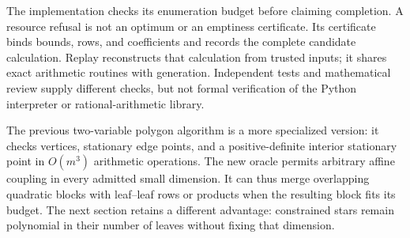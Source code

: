 The implementation
checks its enumeration budget before claiming completion. A resource
refusal is not an optimum or an emptiness certificate. Its certificate
binds bounds, rows, and coefficients and records the complete candidate
calculation. Replay reconstructs that calculation from trusted inputs;
it shares exact arithmetic routines with generation. Independent tests
and mathematical review supply different checks, but not formal
verification of the Python interpreter or rational-arithmetic library.

The previous two-variable polygon algorithm is a more specialized version:
it checks vertices, stationary edge points, and a positive-definite interior
stationary point in $O(m^3)$ arithmetic operations. The new oracle permits
arbitrary affine coupling in every admitted small dimension. It can thus
merge overlapping quadratic blocks with leaf--leaf rows or products when
the resulting block fits its budget. The next section retains a different
advantage: constrained stars remain polynomial in their number of leaves
without fixing that dimension.
